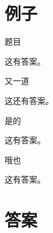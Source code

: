 \documentclass[openany]{ctexbook}
\begin{document}
\startexercise
\chapter{例子}
\begin{exercise}
\item 题目
\begin{answer}
这有答案。
\end{answer}
\item 又一道
\begin{answer}
这还有答案。
\end{answer}
\end{exercise}
\begin{exercise}
  \item 是的
  \begin{answer}
这有答案。
\end{answer}
  \item 哦也
  \begin{answer}
这有答案。
\end{answer}
\end{exercise}
\stopexercise

\chapter{答案}
\printanswer
\end{document}
